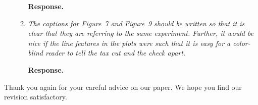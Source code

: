 \documentclass[12pt,letterpaper,english]{article}
\begin{document}
\begin{itemize}
\begin{enumerate}[start=2]
		\noindent \textbf{Response.}  
		
		\item \textit{The captions for Figure~7 and Figure~9 should be written so that it is clear that they are referring to the same experiment. Further, it would be nice if the line features in the plots were such that it is easy for a color-blind reader to tell the tax cut and the check apart.}
		
		\noindent \textbf{Response.}  	
			
	\end{enumerate}
	

	
\end{itemize}

	
	\bigskip
	
	\noindent Thank you again for your careful advice on our paper. We hope you find our revision satisfactory.
	


\end{document}
